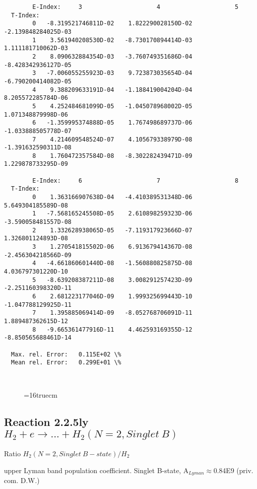 \documentclass[12pt,dvipdfmx]{article}
\begin{document}
{\begin{small}
\begin{verbatim}
        E-Index:     3                     4                     5
  T-Index:
        0   -8.319521746811D-02    1.822290028150D-02   -2.139848284025D-03
        1    3.561940208530D-02   -8.730170894414D-03    1.111181710062D-03
        2    8.090632884354D-03   -3.760749351686D-04   -8.428342936127D-05
        3   -7.006055255923D-03    9.723873035654D-04   -6.790200414082D-05
        4    9.388209633191D-04   -1.188419004204D-04    8.205572285784D-06
        5    4.252484681099D-05   -1.045078968002D-05    1.071348879998D-06
        6   -1.359995374888D-05    1.767498689737D-06   -1.033888505778D-07
        7    4.214609548524D-07    4.105679338979D-08   -1.391632590311D-08
        8    1.760472357584D-08   -8.302282439471D-09    1.229878733295D-09

        E-Index:     6                     7                     8
  T-Index:
        0    1.363166907638D-04   -4.410389531348D-06    5.649304185589D-08
        1   -7.568165245508D-05    2.610898259323D-06   -3.590058481557D-08
        2    1.332628938065D-05   -7.119317923666D-07    1.326801124893D-08
        3    1.270541815502D-06    6.913679414367D-08   -2.456304218566D-09
        4   -4.661860601440D-08   -1.560880825875D-08    4.036797301220D-10
        5   -8.639208387211D-08    3.008291257423D-09   -2.251160398320D-11
        6    2.681223177046D-09    1.999325699443D-10   -1.047788129925D-11
        7    1.395885069414D-09   -8.052768706091D-11    1.889487362615D-12
        8   -9.665361477916D-11    4.462593169355D-12   -8.850565688461D-14

  Max. rel. Error:   0.115E+02 \%
  Mean rel. Error:   0.299E+01 \%



\end{verbatim}\end{small}
\begin{figure} \label{2.2.5we}
\epsfxsize=16truecm
\end{figure}

\newpage


\subsection{
Reaction 2.2.5ly $H_2 + e \rightarrow ...+ H_2(N=2,Singlet \ B)$}

Ratio $H_2(N=2, Singlet \ B-state)/H_2 $

upper Lyman band population coefficient. Singlet B-state, A$_{Lyman} \approx $0.84E9 (priv. com. D.W.)

}
\end{document}
